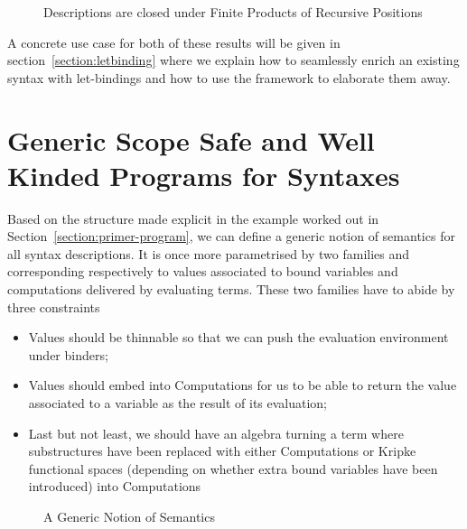 \begin{figure}[h]
\begin{minipage}{0.45\textwidth}
\end{minipage}\hspace{2em}
\begin{minipage}{0.45\textwidth}
\end{minipage}
\caption{Descriptions are closed under Finite Products of Recursive Positions}
\end{figure}

A concrete use case for both of these results will be given in section~\ref{section:letbinding}
where we explain how to seamlessly enrich an existing syntax with let-bindings
and how to use the  framework to elaborate them away.




\section{Generic Scope Safe and Well Kinded Programs for Syntaxes}\label{section:semantics}

Based on the structure made explicit in the example worked out
in Section~\ref{section:primer-program}, we can define a generic notion of
semantics for all syntax descriptions. It is once more parametrised
by two  families  and  corresponding
respectively to values associated to bound variables and
computations delivered by evaluating terms. These two families
have to abide by three constraints
\begin{itemize}
\item Values should be thinnable so that we can push the
      evaluation environment under binders;
\item Values should embed into Computations for us to be able
      to return the value associated to a variable as the
      result of its evaluation;
\item Last but not least, we should have an algebra turning
      a term where substructures have been replaced with
      either Computations or Kripke functional spaces (depending
      on whether extra bound variables have been introduced)
      into Computations
\end{itemize}

\begin{figure}[h]
\caption{A Generic Notion of Semantics}
\end{figure}

